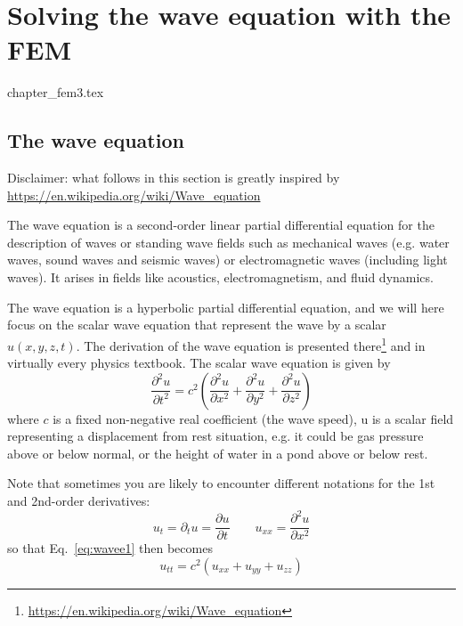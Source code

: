 \chapter{Solving the wave equation with the FEM} \label{fem_waveq} 
\begin{flushright} {\tiny {\color{gray} chapter\_fem3.tex}} \end{flushright}




\section{The wave equation}

Disclaimer: what follows in this section is greatly inspired 
by \url{https://en.wikipedia.org/wiki/Wave_equation} 

The wave equation is a second-order linear partial differential equation 
for the description of waves or standing wave fields such as mechanical waves 
(e.g. water waves, sound waves and seismic waves) or electromagnetic waves 
(including light waves). It arises in fields like acoustics, electromagnetism, and fluid dynamics. 

The wave equation is a hyperbolic partial differential equation,
and we will here focus on the scalar wave equation that 
represent the wave by a scalar $u(x,y,z,t)$.
The derivation of the wave equation is presented 
there\footnote{\url{https://en.wikipedia.org/wiki/Wave_equation}} 
and in virtually every physics textbook. The scalar wave equation is given by
\begin{equation}
\frac{\partial^2 u}{\partial t^2} = c^2 \left(
\frac{\partial^2 u}{\partial x^2} + 
\frac{\partial^2 u}{\partial y^2} + 
\frac{\partial^2 u}{\partial z^2} 
\right)
\label{eq:wavee1}
\end{equation}
where $c$ is a fixed non-negative real coefficient (the wave speed),
u is a scalar field representing a displacement from rest situation, e.g.
it could be gas pressure above or below normal, or the height of water in 
a pond above or below rest.

Note that sometimes you are likely to encounter different notations
for the 1st and 2nd-order derivatives:
\[
u_t = \partial_t u = \frac{\partial u}{\partial t} 
\qquad
u_{xx} = \frac{\partial^2 u}{\partial x^2} 
\]
so that Eq.~\eqref{eq:wavee1} then becomes
\[
u_{tt} = c^2(u_{xx}+u_{yy}+u_{zz})
\]

